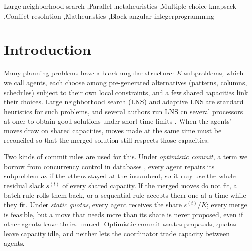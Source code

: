 \documentclass[a4paper,fleqn]{cas-sc}
\begin{document}
\begin{keywords}
Large neighborhood search \sep Parallel metaheuristics \sep Multiple-choice knapsack \sep Conflict resolution \sep Matheuristics \sep Block-angular integer\newline programming
\end{keywords}

\maketitle

\section{Introduction}
\label{sec:intro}

Many planning problems have a block-angular structure: $K$ subproblems, which we call agents, each choose among pre-generated alternatives (patterns, columns, schedules) subject to their own local constraints, and a few shared capacities link their choices. Large neighborhood search (LNS) \citep{shaw1998} and adaptive LNS \citep{ropke2006} are standard heuristics for such problems, and several authors run LNS on several processors at once to obtain good solutions under short time limits \citep{ropke2009, bartodziej2010, asokan2014, chan2024}. When the agents' moves draw on shared capacities, moves made at the same time must be reconciled so that the merged solution still respects those capacities.

Two kinds of commit rules are used for this. Under \emph{optimistic commit}, a term we borrow from concurrency control in databases \citep{kung1981}, every agent repairs its subproblem as if the others stayed at the incumbent, so it may use the whole residual slack $s^{(t)}$ of every shared capacity. If the merged moves do not fit, a batch rule rolls them back, or a sequential rule accepts them one at a time while they fit. Under \emph{static quotas}, every agent receives the share $s^{(t)}/K$; every merge is feasible, but a move that needs more than its share is never proposed, even if other agents leave theirs unused. Optimistic commit wastes proposals, quotas leave capacity idle, and neither lets the coordinator trade capacity between agents.
\end{document}
